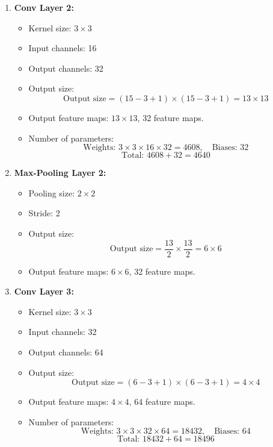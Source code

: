 \begin{enumerate}
    \item \textbf{Conv Layer 2:}
    \begin{itemize}
        \item Kernel size: \( 3 \times 3 \)
        \item Input channels: 16
        \item Output channels: 32
        \item Output size:
        \[
        \text{Output size} = (15 - 3 + 1) \times (15 - 3 + 1) = 13 \times 13
        \]
        \item Output feature maps: \( 13 \times 13 \), 32 feature maps.
        \item Number of parameters:
        \[
        \text{Weights: } 3 \times 3 \times 16 \times 32 = 4608, \quad \text{Biases: } 32
        \]
        \[
        \text{Total: } 4608 + 32 = 4640
        \]
    \end{itemize}

    \item \textbf{Max-Pooling Layer 2:}
    \begin{itemize}
        \item Pooling size: \( 2 \times 2 \)
        \item Stride: 2
        \item Output size:
        \[
        \text{Output size} = \frac{13}{2} \times \frac{13}{2} = 6 \times 6
        \]
        \item Output feature maps: \( 6 \times 6 \), 32 feature maps.
    \end{itemize}

    \item \textbf{Conv Layer 3:}
    \begin{itemize}
        \item Kernel size: \( 3 \times 3 \)
        \item Input channels: 32
        \item Output channels: 64
        \item Output size:
        \[
        \text{Output size} = (6 - 3 + 1) \times (6 - 3 + 1) = 4 \times 4
        \]
        \item Output feature maps: \( 4 \times 4 \), 64 feature maps.
        \item Number of parameters:
        \[
        \text{Weights: } 3 \times 3 \times 32 \times 64 = 18432, \quad \text{Biases: } 64
        \]
        \[
        \text{Total: } 18432 + 64 = 18496
        \]
    \end{itemize}
\end{enumerate}

